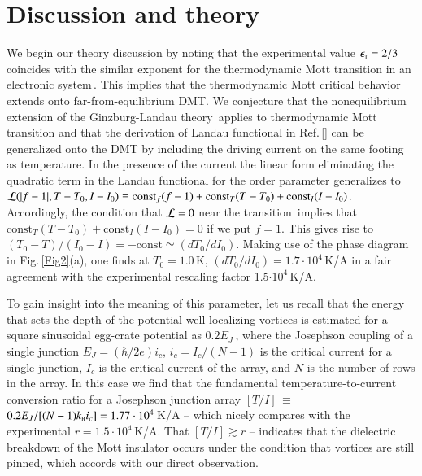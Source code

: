\documentclass[aps,twocolumn,prl,10pt,amsmath,amssymb,nofootinbib,showpacs,superscriptaddress,floatfix]{revtex4-1}
\newcommand{\rs}{\rm\scriptscriptstyle}
\begin{document}
\section*{Discussion and theory}
We begin our theory discussion by noting that the experimental value $\epsilon_{\rs T}=2/3$ coincides with the similar exponent for the thermodynamic Mott transition 
in an electronic system\,\cite{Limelette:2003}. This implies that the thermodynamic Mott critical behavior extends onto far-from-equilibrium DMT. We conjecture that the nonequilibrium extension of the Ginzburg-Landau theory\,\cite{Chtchelk:2009} applies to thermodynamic Mott transition and that the derivation of Landau functional in Ref.\,[] can be generalized onto the DMT by including the driving current on the same footing as temperature. In the presence of the current the linear form eliminating the quadratic term in the Landau functional for the order parameter generalizes to ${\cal L}(|f-1|, T-T_0, I-I_0)\equiv \mathrm{const}_f(f-1)+\mathrm{const}_T(T-T_0)+\mathrm{const}_I(I-I_0)$.
Accordingly, the condition that ${\cal L}=0$ near the transition\,\cite{Kotliar:2000} implies that $\mathrm{const}_T(T-T_0)+\mathrm{const}_I(I-I_0)=0$ if we put $f=1$. This gives rise to $(T_0-T)/(I_0-I)=-\mathrm{const}\simeq(dT_0/dI_0)$.
Making use of the phase diagram in Fig.\,\ref{Fig2}(a), one finds at $T_0=1.0$\,K, 
$(dT_0/dI_0)=1.7\cdot 10^{4}$\,K/A in a fair agreement with the experimental rescaling factor 1.5$\cdot 10^{4}$\,K/A. 

To gain insight into the meaning of this parameter, let us recall that the energy that sets the depth of the potential well localizing vortices is estimated for a square sinusoidal egg-crate potential as $0.2E_J$\,\cite{Lobb:1983}, where the Josephson coupling of a single junction $E_J=(\hbar/2e)i_c$, $i_c=I_c/(N-1)$ is the critical current for a single junction,
$I_c$ is the critical current of the array, and $N$ is the number of rows in the array.
In this case we find that the fundamental temperature-to-current conversion ratio for a Josephson junction array $[T/I]$\,$\equiv$\,$0.2E_J/[(N-1)k_{\rs B}i_c]=1.77\cdot 10^4$\,K/A -- which nicely compares with the experimental $r=1.5\cdot 10^{4}$\,K/A. That $[T/I]\gtrsim r$ -- indicates 
that the dielectric breakdown of the Mott insulator occurs under the condition
that vortices are still pinned, which accords with our direct observation.
\end{document}
